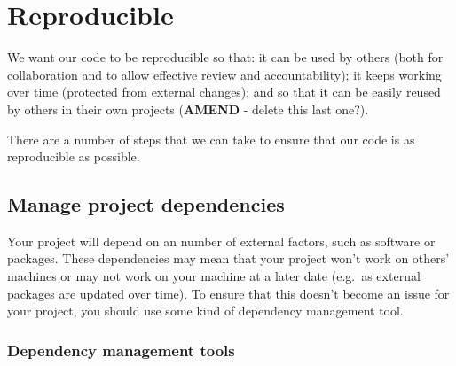 \documentclass[]{book}
\begin{document}
\hypertarget{reproduce}{%
\chapter{Reproducible}\label{reproduce}}

We want our code to be reproducible so that: it can be used by others (both for collaboration and to allow effective review and accountability); it keeps working over time (protected from external changes); and so that it can be easily reused by others in their own projects (\textbf{AMEND} - delete this last one?).

There are a number of steps that we can take to ensure that our code is as reproducible as possible.

\hypertarget{projdep}{%
\section{Manage project dependencies}\label{projdep}}

Your project will depend on an number of external factors, such as software or packages. These dependencies may mean that your project won't work on others' machines or may not work on your machine at a later date (e.g.~as external packages are updated over time). To ensure that this doesn't become an issue for your project, you should use some kind of dependency management tool.

\hypertarget{dependency-management-tools}{%
\subsection*{Dependency management tools}\label{dependency-management-tools}}
\end{document}
